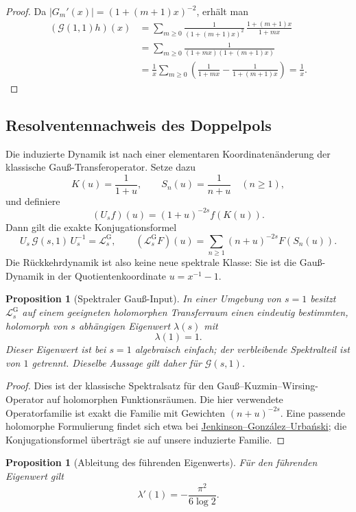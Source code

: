 \documentclass[11pt,a4paper]{article}
\newtheorem{proposition}[remark]{Proposition}
\begin{document}
\begin{proof}
Da $|G_m'(x)|=(1+(m+1)x)^{-2}$, erhält man
\[
 \begin{aligned}
 (\mathcal G(1,1)h)(x)
 &=
 \sum_{m\ge0}
 \frac{1}{(1+(m+1)x)^2}\,
 \frac{1+(m+1)x}{1+mx}\\
 &=
 \sum_{m\ge0}
 \frac1{(1+mx)(1+(m+1)x)}\\
 &=
 \frac1x\sum_{m\ge0}
 \left(
 \frac1{1+mx}-\frac1{1+(m+1)x}
 \right)
 =\frac1x.
 \end{aligned}
\]
\end{proof}


\subsection{Resolventennachweis des Doppelpols}

Die induzierte Dynamik ist nach einer elementaren Koordinatenänderung
der klassische Gauß-Transferoperator. Setze dazu
\[
 K(u)=\frac1{1+u},
 \qquad
 S_n(u)=\frac1{n+u}\quad(n\ge1),
\]
und definiere
\[
 (U_sf)(u)=(1+u)^{-2s}f(K(u)).
\]
Dann gilt die exakte Konjugationsformel
\[
 U_s\,\mathcal G(s,1)\,U_s^{-1}=\mathcal L_s^{\mathrm G},
 \qquad
 (\mathcal L_s^{\mathrm G}F)(u)
 =
 \sum_{n\ge1}(n+u)^{-2s}F(S_n(u)).
\]
Die Rückkehrdynamik ist also keine neue spektrale Klasse: Sie ist die
Gauß-Dynamik in der Quotientenkoordinate $u=x^{-1}-1$.

\begin{proposition}[Spektraler Gauß-Input]
In einer Umgebung von $s=1$ besitzt
$\mathcal L_s^{\mathrm G}$ auf einem geeigneten holomorphen
Transferraum einen eindeutig bestimmten, holomorph von $s$ abhängigen
Eigenwert $\lambda(s)$ mit
\[
 \lambda(1)=1.
\]
Dieser Eigenwert ist bei $s=1$ algebraisch einfach; der verbleibende
Spektralteil ist von $1$ getrennt. Dieselbe Aussage gilt daher für
$\mathcal G(s,1)$.
\end{proposition}

\begin{proof}
Dies ist der klassische Spektralsatz für den Gauß--Kuzmin--Wirsing-
Operator auf holomorphen Funktionsräumen. Die hier verwendete
Operatorfamilie ist exakt die Familie mit Gewichten
$(n+u)^{-2s}$. Eine passende holomorphe Formulierung findet sich etwa
bei \href{https://maths.qmul.ac.uk/~omj/fm6.pdf}
{Jenkinson--González--Urba\'nski}; die Konjugationsformel überträgt sie
auf unsere induzierte Familie.
\end{proof}

\begin{proposition}[Ableitung des führenden Eigenwerts]
Für den führenden Eigenwert gilt
\[
 \lambda'(1)=-\frac{\pi^2}{6\log2}.
\]
\end{proposition}
\end{document}
